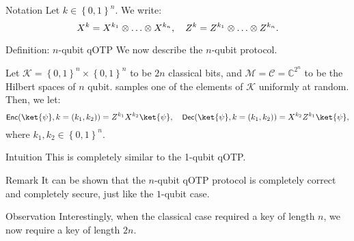 \documentclass[a4paper]{article}
\begin{document}
\begin{parag}{Notation}
    Let $k \in \left\{0, 1\right\}^n$. We write: 
    \[X^k = X^{k_1} \otimes \ldots \otimes X^{k_n}, \quad Z^k = Z^{k_1} \otimes \ldots \otimes Z^{k_n}.\]
\end{parag}

\begin{parag}{Definition: $n$-qubit qOTP}
    We now describe the $n$-qubit  protocol. 

    Let $\mathcal{K} = \left\{0, 1\right\}^n \times \left\{0, 1\right\}^n$ to be $2n$ classical bits, and $\mathcal{M} = \mathcal{C} =\mathbb{C}^{2^n}$ to be the Hilbert spaces of $n$ qubit.  samples one of the elements of $\mathcal{K}$ uniformly at random. Then, we let: 
    \[\lang{Enc}\left(\ket{\psi}, k = \left(k_1, k_2\right)\right) = Z^{k_1} X^{k_2} \ket{\psi}, \mathspace \lang{Dec}\left(\ket{\psi},  k = \left(k_1, k_2\right)\right) = X^{k_2} Z^{k_1} \ket{\psi},\]
    where $k_1, k_2 \in \left\{0, 1\right\}^n$.

    \begin{subparag}{Intuition}
        This is completely similar to the 1-qubit qOTP. 
    \end{subparag}
    
    \begin{subparag}{Remark}
        It can be shown that the $n$-qubit qOTP protocol is completely correct and completely secure, just like the $1$-qubit case.
    \end{subparag}

    \begin{subparag}{Observation}
        Interestingly, when the classical case required a key of length $n$, we now require a key of length $2n$.
    \end{subparag}
\end{parag}
\end{document}
